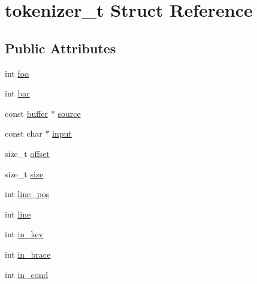 \hypertarget{structtokenizer__t}{\section{tokenizer\-\_\-t Struct Reference}
\label{structtokenizer__t}
}
\subsection*{Public Attributes}
\begin{DoxyCompactItemize}
\item 
int \hyperlink{structtokenizer__t_aeb671697b102a7abdc5de793647b295d}{foo}
\item 
int \hyperlink{structtokenizer__t_aab3fb25eca721fdf164d49e59179877b}{bar}
\item 
const \hyperlink{structbuffer}{buffer} $\ast$ \hyperlink{structtokenizer__t_a36898b19827fb75aa490f0cb73defe97}{source}
\item 
const char $\ast$ \hyperlink{structtokenizer__t_a6bbf17dce934e63d0e8d2ab70cab3c6f}{input}
\item 
size\-\_\-t \hyperlink{structtokenizer__t_a837faa43c58e8ff4f72c21a08a015a51}{offset}
\item 
size\-\_\-t \hyperlink{structtokenizer__t_ad4f8dd1819c2d7221ed42e227f04415a}{size}
\item 
int \hyperlink{structtokenizer__t_ae6a39c5a1bc6835f04dd2d8812f7582c}{line\-\_\-pos}
\item 
int \hyperlink{structtokenizer__t_a67bb4f9264facd6cb0a69ff43a0c9c2c}{line}
\item 
int \hyperlink{structtokenizer__t_ae9a9d1f8d2299346d77f6a0dfba61c29}{in\-\_\-key}
\item 
int \hyperlink{structtokenizer__t_a47a2885a35a004215bd4b8ca033ec1f1}{in\-\_\-brace}
\item 
int \hyperlink{structtokenizer__t_a3a26f2f38a7d20c5610caaab36d104c5}{in\-\_\-cond}
\end{DoxyCompactItemize}


